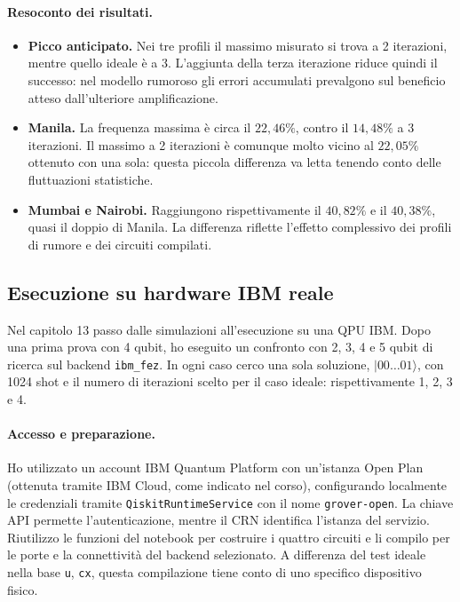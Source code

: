 ﻿\documentclass[a4paper,12pt]{article}
\begin{document}
\paragraph{Resoconto dei risultati.}
\begin{itemize}
    \item \textbf{Picco anticipato.} Nei tre profili il massimo misurato
    si trova a 2 iterazioni, mentre quello ideale è a 3. L'aggiunta
    della terza iterazione riduce quindi il successo: nel modello
    rumoroso gli errori accumulati prevalgono sul beneficio atteso
    dall'ulteriore amplificazione.
    \item \textbf{Manila.} La frequenza massima è circa il $22{,}46\%$,
    contro il $14{,}48\%$ a 3 iterazioni. Il massimo a 2 iterazioni
    è comunque molto vicino al $22{,}05\%$ ottenuto con una sola:
    questa piccola differenza va letta tenendo conto delle fluttuazioni
    statistiche.
    \item \textbf{Mumbai e Nairobi.} Raggiungono rispettivamente
    il $40{,}82\%$ e il $40{,}38\%$, quasi il doppio di Manila.
    La differenza riflette l'effetto complessivo dei profili di rumore
    e dei circuiti compilati.
\end{itemize}

\subsection{Esecuzione su hardware IBM reale}
Nel capitolo 13 passo dalle simulazioni all'esecuzione su una QPU IBM.
Dopo una prima prova con 4 qubit, ho eseguito un confronto con
2, 3, 4 e 5 qubit di ricerca sul backend \texttt{ibm\_fez}.
In ogni caso cerco una sola soluzione, $|00\ldots01\rangle$,
con 1024 shot e il numero di iterazioni scelto per il caso ideale:
rispettivamente 1, 2, 3 e 4.

\paragraph{Accesso e preparazione.}
Ho utilizzato un account IBM Quantum Platform con un'istanza Open Plan
(ottenuta tramite IBM Cloud, come indicato nel corso),
configurando localmente le credenziali tramite \texttt{QiskitRuntimeService}
con il nome \texttt{grover-open}. La chiave API permette l'autenticazione,
mentre il CRN identifica l'istanza del servizio.
Riutilizzo le funzioni del notebook per costruire i quattro circuiti
e li compilo per le porte e la connettività del backend selezionato.
A differenza del test ideale nella base \texttt{u}, \texttt{cx},
questa compilazione tiene conto di uno specifico dispositivo fisico.
\end{document}
